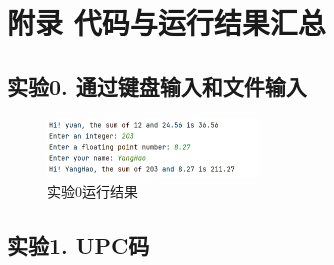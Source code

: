 \chapter{附录 代码与运行结果汇总}

\section{实验0. 通过键盘输入和文件输入}



\begin{figure}[H]
    \centering
    \includegraphics[width = 0.5\textwidth]{../pic/0.png}
    \caption{实验0运行结果}
\end{figure}

\newpage
\section{实验1. UPC码}



